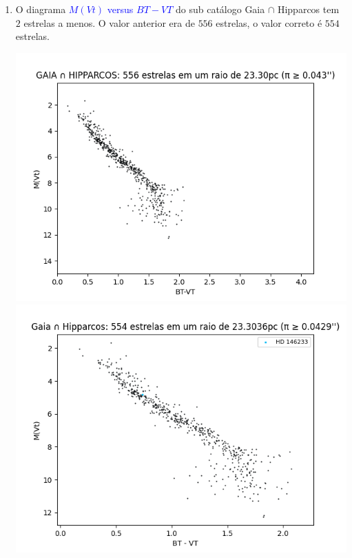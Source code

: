 \documentclass{article}
\begin{document}
	\begin{enumerate}
		
		\item O diagrama \textcolor{blue}{$M(Vt)$ versus $BT-VT$} do sub catálogo Gaia $\cap$ Hipparcos tem $2$ estrelas a menos. O valor anterior era de $556$ estrelas, o valor correto é $554$ estrelas.
		
		\begin{multicols}{2}
			\centering
			\includegraphics[width=.98\linewidth]{gaia_intersection_hipparcos_mvt_versus_bt_minus_vt_plx_greater_than_0.png}
			\columnbreak
			\includegraphics[width=.98\linewidth]{Gaia_intersection_Hipparcos_MVt_versus_BT_minus_VT.png}
		\end{multicols}
	

\end{enumerate}
\end{document}

